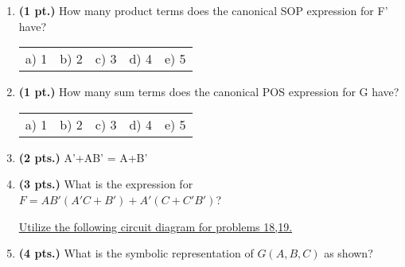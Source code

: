 \documentclass{article}
\begin{document}
\begin{enumerate}
\item {\bf (1 pt.)} How many product terms does the canonical SOP expression 
for F' have?

\begin{tabular}{p{0.7in} p{0.7in} p{0.7in} p{0.7in} l}
a) 1 & b) 2 & c) 3 & d) 4 & e) 5
\end{tabular}

\item {\bf (1 pt.)} How many sum terms does the canonical POS expression for G have?

\begin{tabular}{p{0.7in} p{0.7in} p{0.7in} p{0.7in} l}
a) 1 & b) 2 & c) 3 & d) 4 & e) 5
\end{tabular}

\item {\bf (2 pts.)} A'+AB' = A+B'

\item {\bf (3 pts.)} What is the \SOPmin expression for  \\
$F=AB'(A'C + B') + A'(C+C'B') $?


\pagebreak
\underline{Utilize the following circuit diagram for problems 18,19.}

\begin{figure}[ht]
\end{figure}

\item {\bf (4 pts.)} What is the symbolic representation of $G(A,B,C)$ as shown?


\end{enumerate}
\end{document}
